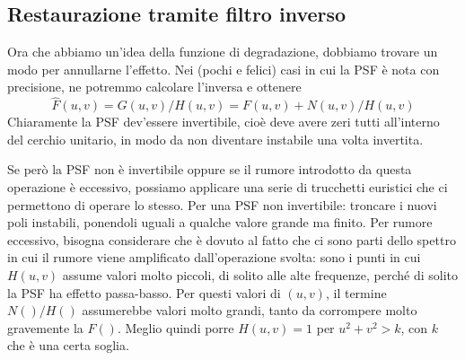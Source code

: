 \documentclass[a4paper,11pt]{article}
\begin{document}
\subsection{Restaurazione tramite filtro inverso}
Ora che abbiamo un'idea della funzione di degradazione, dobbiamo trovare un modo per annullarne l'effetto. Nei (pochi e felici) casi in cui la PSF
è nota con precisione, ne potremmo calcolare l'inversa e ottenere
\[
\hat{F}(u,v) = G(u,v) / H(u,v) = F(u,v) + N(u,v) / H(u,v)
\]
Chiaramente la PSF dev'essere invertibile, cioè deve avere zeri tutti all'interno del cerchio unitario, in modo da non diventare
instabile una volta invertita.
\par
Se però la PSF non è invertibile oppure se il rumore introdotto da questa operazione è eccessivo, possiamo applicare una serie
di trucchetti euristici che ci permettono di operare lo stesso.
Per una PSF non invertibile: troncare i nuovi poli instabili, ponendoli uguali a qualche valore grande ma finito.
Per rumore eccessivo, bisogna considerare che è dovuto al fatto che ci sono parti dello spettro in cui il rumore viene amplificato dall'operazione
svolta: sono i punti in cui $H(u,v)$ assume valori molto piccoli, di solito alle alte frequenze, perché di solito la PSF ha effetto passa-basso.
Per questi valori di $(u,v)$, il termine $N()/H()$ assumerebbe valori molto grandi, tanto da corrompere molto gravemente la $F()$. Meglio quindi
porre $H(u,v) = 1$ per $u^2 + v^2 > k$, con $k$ che è una certa soglia.
\end{document}
